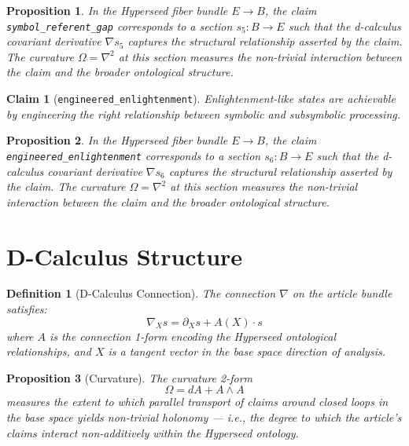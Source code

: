 \documentclass{article}
\newtheorem{claim}{Claim}
\newtheorem{definition}{Definition}
\newtheorem{proposition}{Proposition}
\begin{document}
\begin{proposition}
In the Hyperseed fiber bundle $E \to B$, the claim \texttt{symbol_referent_gap} corresponds to a section $s_5: B \to E$ such that the d-calculus covariant derivative $\nabla s_5$ captures the structural relationship asserted by the claim. The curvature $\Omega = \nabla^2$ at this section measures the non-trivial interaction between the claim and the broader ontological structure.
\end{proposition}

\begin{claim}[\texttt{engineered_enlightenment}]
Enlightenment-like states are achievable by engineering the right relationship between symbolic and subsymbolic processing.
\end{claim}

\begin{proposition}
In the Hyperseed fiber bundle $E \to B$, the claim \texttt{engineered_enlightenment} corresponds to a section $s_6: B \to E$ such that the d-calculus covariant derivative $\nabla s_6$ captures the structural relationship asserted by the claim. The curvature $\Omega = \nabla^2$ at this section measures the non-trivial interaction between the claim and the broader ontological structure.
\end{proposition}

\section{D-Calculus Structure}

\begin{definition}[D-Calculus Connection]
The connection $\nabla$ on the article bundle satisfies:
\begin{equation}
  \nabla_X s = \partial_X s + A(X) \cdot s
\end{equation}
where $A$ is the connection 1-form encoding the Hyperseed ontological relationships, and $X$ is a tangent vector in the base space direction of analysis.
\end{definition}

\begin{proposition}[Curvature]
The curvature 2-form
\begin{equation}
  \Omega = dA + A \wedge A
\end{equation}
measures the extent to which parallel transport of claims around closed loops in the base space yields non-trivial holonomy --- i.e., the degree to which the article's claims interact non-additively within the Hyperseed ontology.
\end{proposition}
\end{document}
